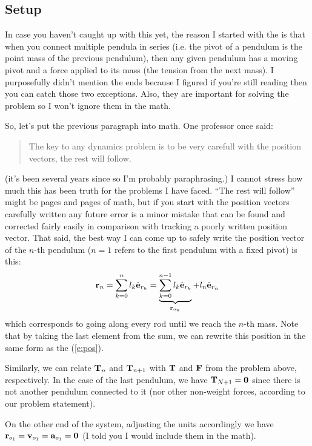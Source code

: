 \documentclass{article}
\begin{document}
\subsection{Setup}
In case you haven't caught up with this yet, the reason I started with the \ntsp is that when you connect multiple pendula in series (i.e. the pivot of a pendulum is the point mass of the previous pendulum), then any given pendulum has a moving pivot and a force applied to its mass (the tension from the next mass). I purposefully didn't mention the ends because I figured if you're still reading then you can catch those two exceptions. Also, they are important for solving the problem so I won't ignore them in the math.

So, let's put the previous paragraph into math. One professor once said: 
\begin{quote}
  The key to any dynamics problem is to be very carefull with the position vectors, the rest will follow.
\end{quote}
(it's been several years since so I'm probably paraphrasing.) I cannot stress how much this has been truth for the problems I have faced. ``The rest will follow'' might be pages and pages of math, but if you start with the position vectors carefully written any future error is a minor mistake that can be found and corrected fairly easily in comparison with tracking a poorly written position vector. That said, the best way I can come up to safely write the position vector of the $n$-th pendulum ($n=1$ refers to the first pendulum with a fixed pivot) is this:
\begin{equation}
  \mathbf{r}_n=\sum_{k=0}^{n}l_k\hat{\mathbf{e}}_{r_{k}}=\underbrace{\sum_{k=0}^{n-1}l_k\hat{\mathbf{e}}_{r_{k}}}_{\mathbf{r}_{o_{n}}}+l_n\hat{\mathbf{e}}_{r_{n}}
\end{equation}
which corresponds to going along every rod until we reach the $n$-th mass. Note that by taking the last element from the sum, we can rewrite this position in the same form as the \ntsp (\cref{e:pos}).

Similarly, we can relate $\mathbf{T}_{n}$ and $\mathbf{T}_{n+1}$ with $\mathbf{T}$ and $\mathbf{F}$ from the \ntsp problem above, respectively. In the case of the last pendulum, we have $\mathbf{T}_{N+1}=\mathbf{0}$ since there is not another pendulum connected to it (nor other non-weight forces, according to our problem statement).

On the other end of the system, adjusting the units accordingly we have $\mathbf{r}_{o_{1}}=\mathbf{v}_{o_{1}}=\mathbf{a}_{o_{1}}=\mathbf{0}$ (I told you I would include them in the math).
\end{document}
